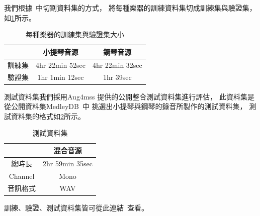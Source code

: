 \documentclass[class=NCU_thesis, crop=false]{standalone}
\begin{document}
我們根據~\cite{Chiu_ChingYu2020MixingSpecific}中切割資料集的方式，
將每種樂器的訓練資料集切成訓練集與驗證集，如\cref{table:table-ours-splited-dataset}所示。
\begin{table}[h]
    \centering
    \caption{每種樂器的訓練集與驗證集大小}
    \label{table:table-ours-splited-dataset}
    \begin{tabular}{|c|c|c|}
        \hline
        \multicolumn{1}{|c|}{} & \multicolumn{1}{|c|}{小提琴音源} & \multicolumn{1}{|c|}{鋼琴音源} \\
        \hline
        訓練集 & 4hr 22min 52sec & 4hr 22min 32sec \\
        \hline
        驗證集 & 1hr 1min 12sec & 1hr 39sec \\
        \hline
    \end{tabular}
\end{table}

測試資料集我們採用Aug4mss
提供的公開整合測試資料集進行評估，
此資料集是從公開資料集MedleyDB~\cite{Bittner2014MedleyDB}中
挑選出小提琴與鋼琴的錄音所製作的測試資料集，
測試資料集的格式如\cref{table:table-test-dataset}所示。
\begin{table}[H]
    \centering
    \caption{測試資料集}
    \label{table:table-test-dataset}
    \begin{tabular}{|c|c|}
        \hline
        \multicolumn{1}{|c|}{} & \multicolumn{1}{|c|}{混合音源} \\
        \hline
        總時長 & 2hr 59min 35sec \\
        \hline
        Channel & Mono \\
        \hline
        音訊格式 & WAV \\
        \hline
    \end{tabular}
\end{table}

訓練、驗證、測試資料集皆可從此連結~\cite{YuJieLin2024MSSDataset}查看。
\end{document}
